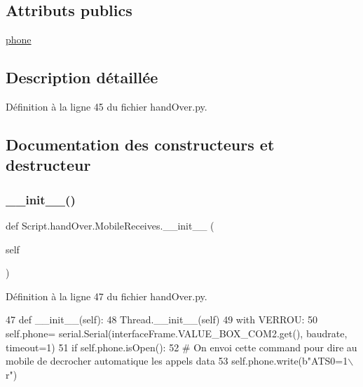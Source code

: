 \subsection*{Attributs publics}
\begin{DoxyCompactItemize}
\item 
\hyperlink{classScript_1_1handOver_1_1MobileReceives_abb579ed112e4ce4e91762febd524d789}{phone}
\end{DoxyCompactItemize}


\subsection{Description détaillée}


Définition à la ligne 45 du fichier hand\+Over.\+py.



\subsection{Documentation des constructeurs et destructeur}
\mbox{\label{classScript_1_1handOver_1_1MobileReceives_abb762c0c475770a14588d7005e1320da}} 
\subsubsection{\texorpdfstring{\+\_\+\+\_\+init\+\_\+\+\_\+()}{\_\_init\_\_()}}
{\footnotesize\ttfamily def Script.\+hand\+Over.\+Mobile\+Receives.\+\_\+\+\_\+init\+\_\+\+\_\+ (\begin{DoxyParamCaption}\item[{}]{self }\end{DoxyParamCaption})}



Définition à la ligne 47 du fichier hand\+Over.\+py.


\begin{DoxyCode}
47     \textcolor{keyword}{def }\_\_init\_\_(self):
48         Thread.\_\_init\_\_(self)
49         with VERROU:
50             self.phone= serial.Serial(interfaceFrame.VALUE\_BOX\_COM2.get(), baudrate, timeout=1)
51         \textcolor{keywordflow}{if} self.phone.isOpen():
52             \textcolor{comment}{# On envoi cette command pour dire au mobile de decrocher automatique les appels data
}
53             self.phone.write(b\textcolor{stringliteral}{"ATS0=1\(\backslash\)r"})
\end{DoxyCode}


